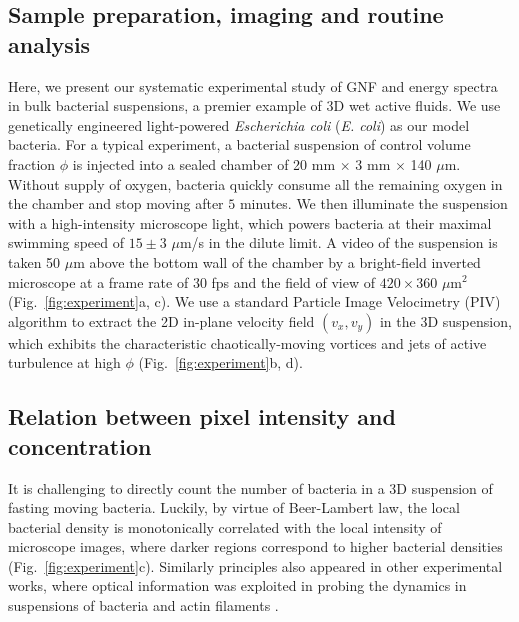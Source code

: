 \subsection{Sample preparation, imaging and routine analysis}
Here, we present our systematic experimental study of GNF and energy spectra in bulk bacterial suspensions, a premier example of 3D wet active fluids. We use genetically engineered light-powered \textit{Escherichia coli} (\textit{E. coli}) as our model bacteria.
For a typical experiment, a bacterial suspension of control volume fraction $\phi$ is injected into a sealed chamber of 20 mm $\times$ 3 mm $\times$ 140 $\mu$m.
Without supply of oxygen, bacteria quickly consume all the remaining oxygen in the chamber and stop moving after $5$ minutes.
We then illuminate the suspension with a high-intensity microscope light, which powers bacteria at their maximal swimming speed of $15 \pm 3$ $\mu$m/s in the dilute limit.
A video of the suspension is taken 50 $\mu$m above the bottom wall of the chamber by a bright-field inverted microscope at a frame rate of $30$ fps and the field of view of $420 \times 360$ $\mu$m$^2$ (Fig.~\ref{fig:experiment}a, c).
We use a standard Particle Image Velocimetry (PIV) algorithm \cite{OpenPIV-website}
to extract the 2D in-plane velocity field $(v_x,v_y)$ in the 3D suspension, which exhibits the characteristic chaotically-moving vortices and jets of active turbulence at high $\phi$ (Fig.~\ref{fig:experiment}b, d).

\subsection{Relation between pixel intensity and concentration}

It is challenging to directly count the number of bacteria in a 3D suspension of fasting moving bacteria. Luckily, by virtue of Beer-Lambert law, the local bacterial density is monotonically correlated with the local intensity of microscope images, where darker regions correspond to higher bacterial densities (Fig.~\ref{fig:experiment}c). Similarly principles also appeared in other experimental works, where optical information was exploited in probing the dynamics in suspensions of bacteria and actin filaments \cite{Sokolov2009, Wilson2011, Schaller2013}.

